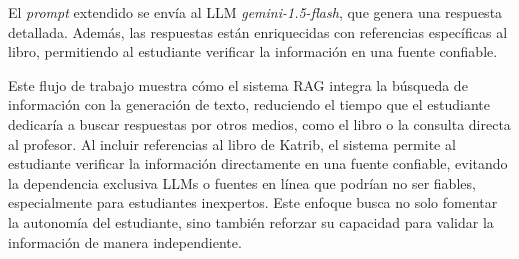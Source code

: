 \documentclass{article}
\begin{document}
El \textit{prompt} extendido se envía al LLM \textit{gemini-1.5-flash}, que genera una respuesta detallada. Además, las respuestas están enriquecidas con referencias específicas al libro, permitiendo al estudiante verificar la información en una fuente confiable.

Este flujo de trabajo muestra cómo el sistema RAG integra la búsqueda de información con la generación de texto, reduciendo el tiempo que el estudiante dedicaría a buscar respuestas por otros medios, como el libro o la consulta directa al profesor. Al incluir referencias al libro de Katrib, el sistema permite al estudiante verificar la información directamente en una fuente confiable, evitando la dependencia exclusiva LLMs o fuentes en línea que podrían no ser fiables, especialmente para estudiantes inexpertos. Este enfoque busca no solo fomentar la autonomía del estudiante, sino también reforzar su capacidad para validar la información de manera independiente.
\end{document}

